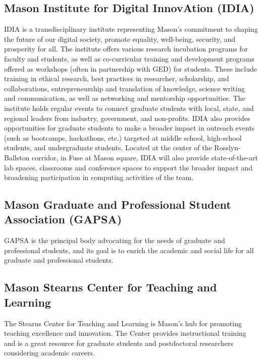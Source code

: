 \documentclass[11pt]{article}
\newcommand{\alert}[1]{{\color{blue}{#1}}}
\begin{document}
\subsection*{Mason Institute for Digital InnovAtion (IDIA)} IDIA is a transdisciplinary institute representing Mason’s commitment to shaping the future of our digital society, promote equality, well-being, security, and prosperity for all. The institute offers various research incubation programs for faculty and students, as well as co-curricular training and development programs offered as workshops (often in partnership with GED) for students. These include training in ethical research, best practices in researcher, scholarship, and collaborations, entrepreneurship and translation of knowledge, science writing and communication, as well as networking and mentorship opportunities. The institute holds regular events to connect graduate students with local, state, and regional leaders from industry, government, and non-profits. IDIA also provides opportunities for graduate students to make a broader impact in outreach events (such as bootcamps, hackathons, etc.) targeted at middle school, high-school students, and undergraduate students. Located at the center of the Rosslyn-Ballston corridor, in Fuse at Mason square, IDIA will also provide state-of-the-art lab spaces, classrooms and conference spaces to support the broader impact and broadening participation in computing activities of the team.

\alert{The PIs will encourage the graduate students in this project to participate in such events and use these resources to improve their professional development and networking opportunities.}

\subsection*{Mason Graduate and Professional Student Association (GAPSA)}  GAPSA is the principal body advocating for the needs of graduate and professional students, and its goal is to enrich the academic and social life for all graduate and professional students.

\alert{The PIs will encourage the graduate students in this project to connect through GAPSA with the larger graduate student community so that they can enrich their experiences.}

\subsection*{Mason Stearns Center for Teaching and Learning} The Stearns Center for Teaching and Learning is Mason’s hub for promoting teaching excellence and innovation. The Center provides instructional training and is a great resource for graduate students and postdoctoral researchers considering academic careers.

\alert{The PIs will encourage their students to make use of the Center's training programs and resources, which include professional development.}
\end{document}
